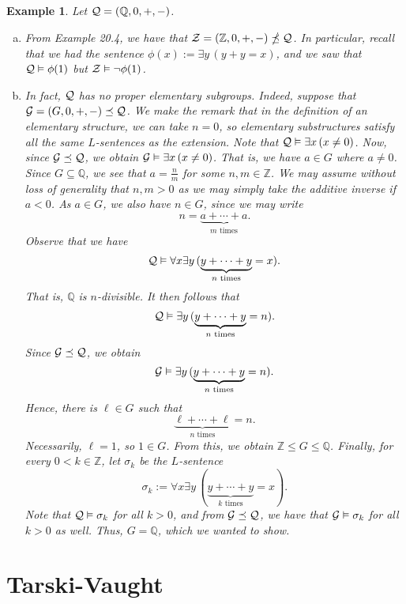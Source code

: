 \documentclass[10pt]{article}
\newcommand{\Z}{\mathbb{Z}}
\newcommand{\Q}{\mathbb{Q}}
\theoremstyle{newstyle}
\newtheorem{exmp}[thm]{Example}
\begin{document}
\begin{exmp}
Let ${\cal Q} = (\Q, 0, +, -)$.
\begin{enumerate}[(a)]
    \item From Example 20.4, we have that ${\cal Z} = (\Z, 0, +, -) \npreceq {\cal Q}$. 
    In particular, recall that we had the sentence $\phi(x) := \exists y \, (y + y = x)$, 
    and we saw that ${\cal Q} \vDash \phi(1)$ but ${\cal Z} \vDash \neg \phi(1)$.
    
    \item In fact, ${\cal Q}$ has no proper elementary subgroups. Indeed, suppose that 
    ${\cal G} = (G, 0, +, -) \preceq {\cal Q}$. 
    We make the remark that in the definition of an elementary structure, we can take 
    $n = 0$, so elementary substructures satisfy all the same $L$-sentences as the extension. 
    Note that ${\cal Q} \vDash \exists x \, (x \neq 0)$. 
    Now, since ${\cal G \preceq Q}$, we obtain ${\cal G} \vDash \exists x \, (x \neq 0)$. That is, 
    we have $a \in G$ where $a \neq 0$. Since $G \subseteq \Q$, we see that $a = \frac{n}{m}$ 
    for some $n, m \in \Z$. We may assume without loss of generality that $n, m > 0$ as 
    we may simply take the additive inverse if $a < 0$. 
    As $a \in G$, we also have $n \in G$, since we may write 
    \[ n = \underbrace{a + \cdots + a}_{\text{$m$ times}}. \]
    Observe that we have 
    \[ {\cal Q} \vDash \forall x \exists y \, (\underbrace{y + \cdots + y}_{\text{$n$ times}} = x). \]
    That is, $\Q$ is $n$-divisible. It then follows that 
    \[ {\cal Q} \vDash \exists y \, (\underbrace{y + \cdots + y}_{\text{$n$ times}} = n). \]
    Since ${\cal G \preceq Q}$, we obtain 
    \[ {\cal G} \vDash \exists y \, (\underbrace{y + \cdots + y}_{\text{$n$ times}} = n). \]
    Hence, there is $\ell \in G$ such that 
    \[ \underbrace{\ell + \cdots + \ell}_{\text{$n$ times}} = n. \]
    Necessarily, $\ell = 1$, so $1 \in G$. From this, we obtain $\Z \leq G \leq \Q$. 
    Finally, for every $0 < k \in \Z$, let $\sigma_k$ be the $L$-sentence 
    \[ \sigma_k := \forall x \exists y \, (\underbrace{y + \cdots + y}_{\text{$k$ times}} = x). \]
    Note that ${\cal Q} \vDash \sigma_k$ for all $k > 0$, and from ${\cal G \preceq Q}$, 
    we have that ${\cal G} \vDash \sigma_k$ 
    for all $k > 0$ as well. Thus, $G = \Q$, which we wanted to show.
\end{enumerate}
\end{exmp}

\newpage 
\section{Tarski-Vaught}
\end{document}
